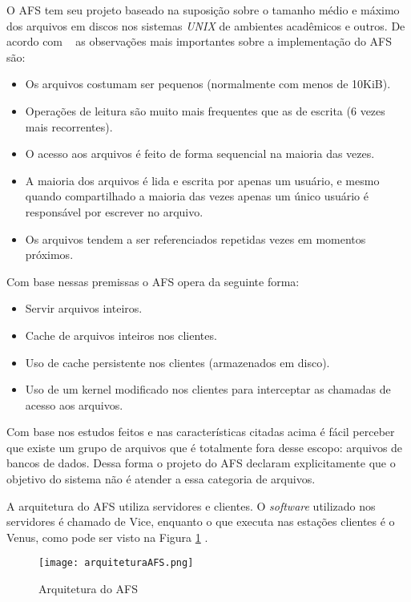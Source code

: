     O AFS tem seu projeto baseado na suposição sobre o tamanho médio e máximo dos arquivos em discos nos sistemas \textit{UNIX} de ambientes acadêmicos e outros. De acordo com ~\cite{coulouris} as observações mais importantes sobre a implementação do AFS são:
    \begin{itemize}
        \item Os arquivos costumam ser pequenos (normalmente com menos de 10KiB).
        \item Operações de leitura são muito mais frequentes que as de escrita (6 vezes mais recorrentes).
        \item O acesso aos arquivos é feito de forma sequencial na maioria das vezes.
        \item A maioria dos arquivos é lida e escrita por apenas um usuário, e mesmo quando compartilhado a maioria das vezes apenas um único usuário é responsável por escrever no arquivo.
        \item Os arquivos tendem a ser referenciados repetidas vezes em momentos próximos.
    \end{itemize}
    
    Com base nessas premissas o AFS opera da seguinte forma:
    \begin{itemize}
        \item Servir arquivos inteiros.
        \item Cache de arquivos inteiros nos clientes.
        \item Uso de cache persistente nos clientes (armazenados em disco).
        \item Uso de um kernel modificado nos clientes para interceptar as chamadas de acesso aos arquivos.
    \end{itemize}
    
    Com base nos estudos feitos e nas características citadas acima é fácil perceber que existe um grupo de arquivos que é totalmente fora desse escopo: arquivos de bancos de dados. Dessa forma o projeto do AFS declaram explicitamente que o objetivo do sistema não é atender a essa categoria de arquivos.
    
    A arquitetura do AFS utiliza servidores e clientes. O \textit{software} utilizado nos servidores é chamado de Vice, enquanto o que executa nas estações clientes é o Venus, como pode ser visto na Figura \ref{fig:arquiteturaAFS} .
    
    \begin{figure}[h]
        \centering
        \texttt{[image: arquiteturaAFS.png]}
        \caption{Arquitetura do AFS ~\cite{coulouris}}
        \label{fig:arquiteturaAFS}
    \end{figure}
    
